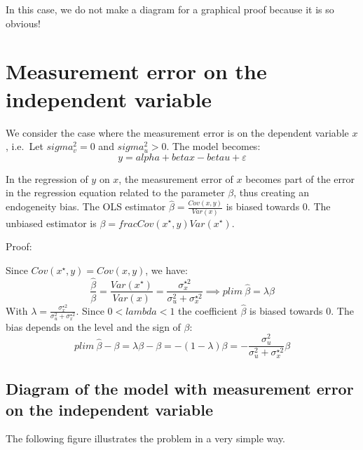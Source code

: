 \documentclass[
]{report}
\begin{document}
In this case, we do not make a diagram for a graphical proof because it is so obvious!

\hypertarget{measurement-error-on-the-independent-variable}{%
\section{Measurement error on the independent variable}\label{measurement-error-on-the-independent-variable}}

We consider the case where the measurement error is on the dependent variable \(x\), i.e.~Let \(sigma_v^2 =0\) and \(sigma_u^2 >0\).
The model becomes:
\[y=alpha+beta x -beta u + \varepsilon\]

In the regression of \(y\) on \(x\), the measurement error of \(x\) becomes part of the error in the regression equation related to the parameter \(\beta\), thus creating an endogeneity bias. The OLS estimator \(\hat{\beta}=\frac{Cov(x,y)}{Var(x)}\) is biased towards 0. The unbiased estimator is \(\beta=frac{Cov(x^\star ,y)}{Var(x^\star)}\).

Proof:

Since \(Cov(x^\star,y)=Cov(x,y)\), we have:
\[\frac{\hat{\beta}}{\beta}=\frac{Var(x^\star)}{Var(x)}=\frac{\sigma_x^{\star 2}}{\sigma_u^2+\sigma_x^{\star 2}} \implies plim~\hat{\beta}=\lambda \beta\]
With \(\lambda=\frac{\sigma_x^{\star 2}}{\sigma_u^2+\sigma_x^{\star 2}}\). Since \(0<lambda<1\) the coefficient \(\hat{\beta}\) is biased towards 0.
The bias depends on the level and the sign of \(\beta\):
\[
plim~\hat{\beta}-\beta=\lambda \beta-\beta=-(1-\lambda)\beta=-\frac{\sigma_u^2}{\sigma_u^2+\sigma_x^{\star 2}}\beta
\]

\hypertarget{diagram-of-the-model-with-measurement-error-on-the-independent-variable}{%
\subsection{Diagram of the model with measurement error on the independent variable}\label{diagram-of-the-model-with-measurement-error-on-the-independent-variable}}

The following figure illustrates the problem in a very simple way.
\end{document}
